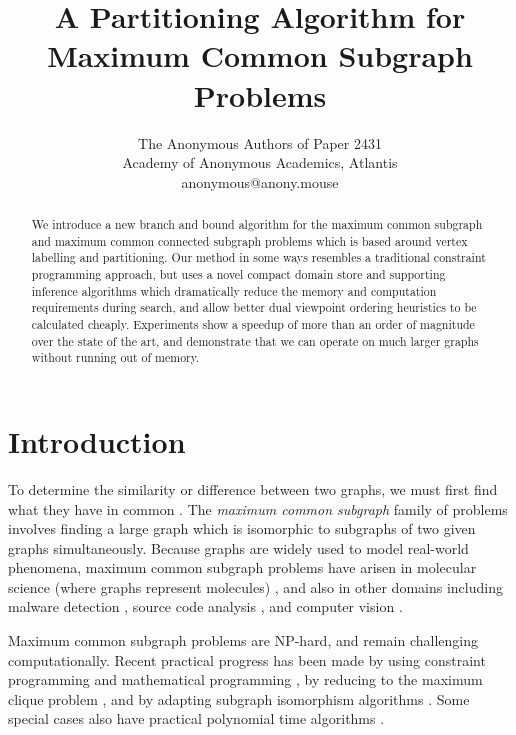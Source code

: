 \documentclass[letterpaper]{article}
\title{A Partitioning Algorithm for Maximum Common Subgraph Problems}
\author{The Anonymous Authors of Paper 2431 \\
Academy of Anonymous Academics, Atlantis \\
anonymous@anony.mouse}
\newcommand{\citep}[1]{\cite{#1}}
\begin{document}
\maketitle

\begin{abstract}
    We introduce a new branch and bound algorithm for the maximum common
    subgraph and maximum common connected subgraph problems which is based
    around vertex labelling and partitioning. Our method in some ways resembles
    a traditional constraint programming approach, but uses a novel compact
    domain store and supporting inference algorithms which dramatically reduce
    the memory and computation requirements during search, and allow better
    dual viewpoint ordering heuristics to be calculated cheaply.  Experiments
    show a speedup of more than an order of magnitude over the state of the
    art, and demonstrate that we can operate on much larger graphs without
    running out of memory.
\end{abstract}

\section{Introduction}

To determine the similarity or difference between two graphs, we must first
find what they have in common
\citep{DBLP:journals/prl/Bunke97,DBLP:journals/prl/FernandezV01,KriegeThesis}.
The \emph{maximum common subgraph} family of problems involves finding a large
graph which is isomorphic to subgraphs of two given graphs simultaneously.
Because graphs are widely used to model real-world phenomena, maximum common
subgraph problems have arisen in molecular science (where graphs represent
molecules)
\citep{DBLP:journals/jcamd/RaymondW02a,Ehrlich:2011,DAM2014,Grindley1993707},
and also in other domains including malware detection
\citep{DBLP:journals/compsec/ParkRS13}, source code analysis
\cite{DBLP:journals/tkde/DjokoCH97}, and computer vision
\cite{DBLP:journals/jair/CookH94}.

Maximum common subgraph problems are NP-hard, and remain challenging
computationally. Recent practical progress has been made by using constraint
programming \citep{DBLP:conf/mco/VismaraV08,DBLP:conf/cp/NdiayeS11,DBLP:conf/cp/McCreeshNPS16} and
mathematical programming \citep{DBLP:journals/dam/BahienseMPS12}, by reducing
to the maximum clique problem \citep{LeviG,DBLP:conf/cp/McCreeshNPS16}, and by
adapting subgraph isomorphism algorithms \citep{UpcomingAAAIPaper}. Some
special cases also have practical polynomial time algorithms
\citep{DBLP:conf/mfcs/DroschinskyKM16,DBLP:conf/sofsem/DroschinskyKM17}.
\end{document}
